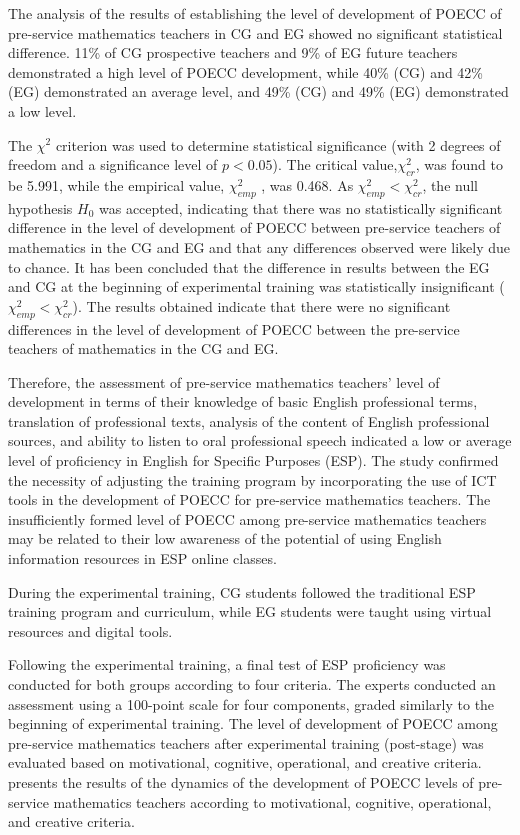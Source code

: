 The analysis of the results of establishing the level of development of
POECC of pre-service mathematics teachers in CG and EG showed no
significant statistical difference. 11\% of CG prospective teachers and
9\% of EG future teachers demonstrated a high level of POECC
development, while 40\% (CG) and 42\% (EG) demonstrated an average
level, and 49\% (CG) and 49\% (EG) demonstrated a low level.

The $\chi^2$ criterion was used to determine statistical significance (with 2
degrees of freedom and a significance level of $p < 0.05$). 
The critical value,$\chi^2_{cr}$, was found to be 5.991, while the empirical
value, $\chi^2_{emp}$ , was 0.468. As $\chi^2_{emp} < \chi^2_{cr}$, the null hypothesis
$H_0$ was accepted, indicating that there was
no statistically significant difference in the level of development of
POECC between pre-service teachers of mathematics in the CG and EG and
that any differences observed were likely due to chance. It has been
concluded that the difference in results between the EG and CG at the
beginning of experimental training was statistically insignificant ($\chi^2_{emp} < \chi^2_{cr}$). 
The results obtained indicate that there were no
significant differences in the level of development of POECC between the
pre-service teachers of mathematics in the CG and EG.

Therefore, the assessment of pre-service mathematics teachers' level of
development in terms of their knowledge of basic English professional
terms, translation of professional texts, analysis of the content of
English professional sources, and ability to listen to oral professional
speech indicated a low or average level of proficiency in English for
Specific Purposes (ESP). The study confirmed the necessity of adjusting
the training program by incorporating the use of ICT tools in the
development of POECC for pre-service mathematics teachers. The
insufficiently formed level of POECC among pre-service mathematics
teachers may be related to their low awareness of the potential of using
English information resources in ESP online classes.

During the experimental training, CG students followed the traditional
ESP training program and curriculum, while EG students were taught using
virtual resources and digital tools.

Following the experimental training, a final test of ESP proficiency was
conducted for both groups according to four criteria. The experts
conducted an assessment using a 100-point scale for four components,
graded similarly to the beginning of experimental training. The level of
development of POECC among pre-service mathematics teachers after
experimental training (post-stage) was evaluated based on motivational,
cognitive, operational, and creative criteria.  presents the
results of the dynamics of the development of POECC levels of
pre-service mathematics teachers according to motivational, cognitive,
operational, and creative criteria.

